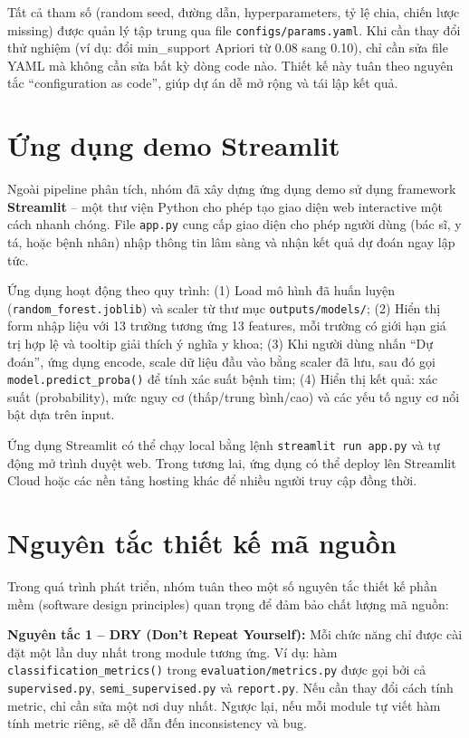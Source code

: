 Tất cả tham số (random seed, đường dẫn, hyperparameters, tỷ lệ chia, chiến lược missing) được quản lý tập trung qua file \texttt{configs/params.yaml}. Khi cần thay đổi thử nghiệm (ví dụ: đổi min\_support Apriori từ 0.08 sang 0.10), chỉ cần sửa file YAML mà không cần sửa bất kỳ dòng code nào. Thiết kế này tuân theo nguyên tắc ``configuration as code'', giúp dự án dễ mở rộng và tái lập kết quả.

\section{Ứng dụng demo Streamlit}

Ngoài pipeline phân tích, nhóm đã xây dựng ứng dụng demo sử dụng framework \textbf{Streamlit} -- một thư viện Python cho phép tạo giao diện web interactive một cách nhanh chóng. File \texttt{app.py} cung cấp giao diện cho phép người dùng (bác sĩ, y tá, hoặc bệnh nhân) nhập thông tin lâm sàng và nhận kết quả dự đoán ngay lập tức.

Ứng dụng hoạt động theo quy trình: (1) Load mô hình đã huấn luyện (\texttt{random\_forest.joblib}) và scaler từ thư mục \texttt{outputs/models/}; (2) Hiển thị form nhập liệu với 13 trường tương ứng 13 features, mỗi trường có giới hạn giá trị hợp lệ và tooltip giải thích ý nghĩa y khoa; (3) Khi người dùng nhấn ``Dự đoán'', ứng dụng encode, scale dữ liệu đầu vào bằng scaler đã lưu, sau đó gọi \texttt{model.predict\_proba()} để tính xác suất bệnh tim; (4) Hiển thị kết quả: xác suất (probability), mức nguy cơ (thấp/trung bình/cao) và các yếu tố nguy cơ nổi bật dựa trên input.

Ứng dụng Streamlit có thể chạy local bằng lệnh \texttt{streamlit run app.py} và tự động mở trình duyệt web. Trong tương lai, ứng dụng có thể deploy lên Streamlit Cloud hoặc các nền tảng hosting khác để nhiều người truy cập đồng thời.

\section{Nguyên tắc thiết kế mã nguồn}

Trong quá trình phát triển, nhóm tuân theo một số nguyên tắc thiết kế phần mềm (software design principles) quan trọng để đảm bảo chất lượng mã nguồn:

\textbf{Nguyên tắc 1 -- DRY (Don't Repeat Yourself):} Mỗi chức năng chỉ được cài đặt một lần duy nhất trong module tương ứng. Ví dụ: hàm \texttt{classification\_metrics()} trong \texttt{evaluation/metrics.py} được gọi bởi cả \texttt{supervised.py}, \texttt{semi\_supervised.py} và \texttt{report.py}. Nếu cần thay đổi cách tính metric, chỉ cần sửa một nơi duy nhất. Ngược lại, nếu mỗi module tự viết hàm tính metric riêng, sẽ dễ dẫn đến inconsistency và bug.


